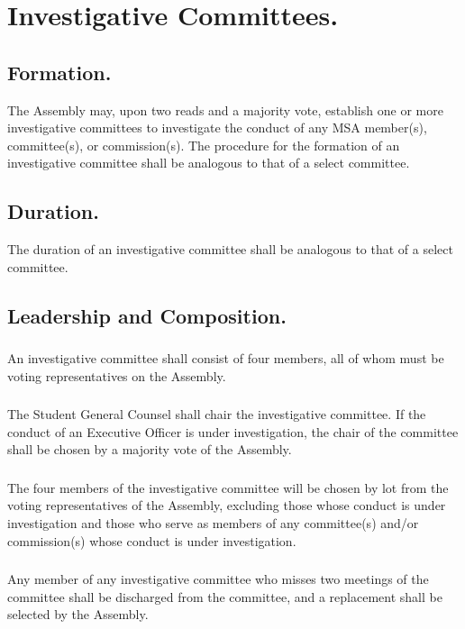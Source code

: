 \documentclass{rules}
\begin{document}
\section{Investigative Committees.}
\subsection{Formation.}
The Assembly may, upon two reads and a majority vote, establish one or more investigative committees to investigate the conduct of any MSA member(s), committee(s), or commission(s).  The procedure for the formation of an investigative committee shall be analogous to that of a select committee.
\subsection{Duration.}
The duration of an investigative committee shall be analogous to that of a select committee.
\subsection{Leadership and Composition.}
\subsubsection{}
An investigative committee shall consist of four members, all of whom must be voting representatives on the Assembly.  
\subsubsection{}
The Student General Counsel shall chair the investigative committee.  If the conduct of an Executive Officer is under investigation, the chair of the committee shall be chosen by a majority vote of the Assembly.
\subsubsection{}
The four members of the investigative committee will be chosen by lot from the voting representatives of the Assembly, excluding those whose conduct is under investigation and those who serve as members of any committee(s) and/or commission(s) whose conduct is under investigation.
\subsubsection{}
Any member of any investigative committee who misses two meetings of the committee shall be discharged from the committee, and a replacement shall be selected by the Assembly.
\end{document}
